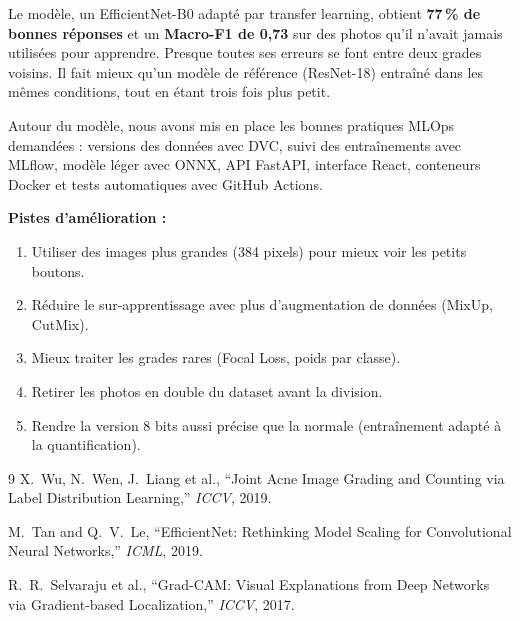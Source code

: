 \documentclass[11pt,a4paper]{report}
\begin{document}
\medskip
Le modèle, un EfficientNet-B0 adapté par transfer learning, obtient \textbf{77\,\% de bonnes
réponses} et un \textbf{Macro-F1 de 0,73} sur des photos qu'il n'avait jamais utilisées pour
apprendre. Presque toutes ses erreurs se font entre deux grades voisins. Il fait mieux qu'un
modèle de référence (ResNet-18) entraîné dans les mêmes conditions, tout en étant trois fois plus
petit.

\medskip
Autour du modèle, nous avons mis en place les bonnes pratiques MLOps demandées : versions
des données avec DVC, suivi des entraînements avec MLflow, modèle léger avec ONNX, API
FastAPI, interface React, conteneurs Docker et tests automatiques avec GitHub Actions.

\medskip
\textbf{Pistes d'amélioration :}
\begin{enumerate}[noitemsep,topsep=4pt]
    \item Utiliser des images plus grandes (384 pixels) pour mieux voir les petits boutons.
    \item Réduire le sur-apprentissage avec plus d'augmentation de données (MixUp, CutMix).
    \item Mieux traiter les grades rares (Focal Loss, poids par classe).
    \item Retirer les photos en double du dataset avant la division.
    \item Rendre la version 8 bits aussi précise que la normale (entraînement adapté à la quantification).
\end{enumerate}

\begin{thebibliography}{9}
X.~Wu, N.~Wen, J.~Liang et al.,
``Joint Acne Image Grading and Counting via Label Distribution Learning,''
\textit{ICCV}, 2019.

M.~Tan and Q.~V.~Le,
``EfficientNet: Rethinking Model Scaling for Convolutional Neural Networks,''
\textit{ICML}, 2019.

R.~R.~Selvaraju et al.,
``Grad-CAM: Visual Explanations from Deep Networks via Gradient-based Localization,''
\textit{ICCV}, 2017.
\end{thebibliography}
\end{document}
